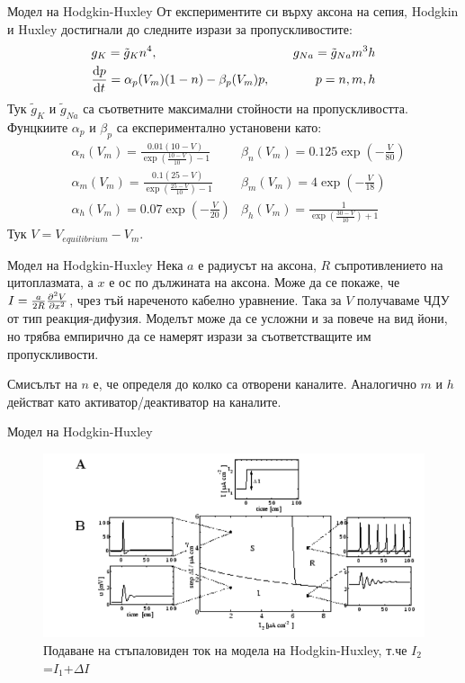 \begin{frame}[t]{Модел на Hodgkin-Huxley}
  От експериментите си върху аксона на сепия, Hodgkin и Huxley достигнали до следните изрази за пропускливостите:
  \begin{align*}
    &g_{K}=\tilde{g}_{K}n^4,\quad &g_{Na}=\tilde{g}_{Na}m^3h \\
    &\dv{p}{t}=\alpha_p(V_m)(1-n)-\beta_p(V_m)p,\quad &p={n,m,h}
  \end{align*}
  Тук $\tilde{g}_{K}$ и $\tilde{g}_{Na}$ са съответните максимални стойности на пропускливостта.
  Фунцкиите $\alpha_p$ и $\beta_p$ са експериментално установени като: 
  \begin{align*}
    &\alpha_{n}(V_{m})={\frac{0.01(10-V)}{\exp\left({\frac{10-V}{10}}\right)-1}} &\beta_{n}(V_{m})=0.125\exp\left(-\frac{V}{80}\right)\\
    &\alpha_{m}(V_{m})={\frac{0.1(25-V)}{\exp\left({\frac{25-V}{10}}\right)-1}} &\beta_{m}(V_{m})=4\exp\left(-\frac{V}{18}\right)\\
    &\alpha_{h}(V_{m})=0.07\exp\left(-{\frac{V}{20}}\right) &\beta_{h}(V_{m})={\frac{1}{\exp\left({\frac{30-V}{10}}\right)+1}}  
  \end{align*}
  Тук $V = V_{equilibrium} - V_m$.
\end{frame}

\begin{frame}[t]{Модел на Hodgkin-Huxley}
  Нека $a$ е радиусът на аксона, $R$ съпротивлението на цитоплазмата, а $x$ е ос по дължината на аксона.
  Може да се покаже, че $I={\frac{a}{2R}}\pdv[2]{V}{x}$, чрез тъй нареченото кабелно уравнение.
  Така за $V$ получаваме ЧДУ от тип реакция-дифузия.
  Моделът може да се усложни и за повече на вид йони, но трябва емпирично да се намерят изрази за съответстващите им пропускливости.

  Смисълът на $n$ е, че определя до колко са отворени  каналите.
  Аналогично $m$ и $h$ действат като активатор/деактиватор на  каналите.
\end{frame}

\begin{frame}[t]{Модел на Hodgkin-Huxley}
  \begin{figure}[htbp!]
      \centering
      \includegraphics[width=\textwidth,height=0.7\textheight,keepaspectratio]{img/hodgkin-huxley/response.PNG}
      \caption{Подаване на стъпаловиден ток на модела на Hodgkin-Huxley, т.че $I_2$=$I_1$+$\Delta I$ \cite[Фиг 2.6]{Spiking}}
  \end{figure}
\end{frame}

